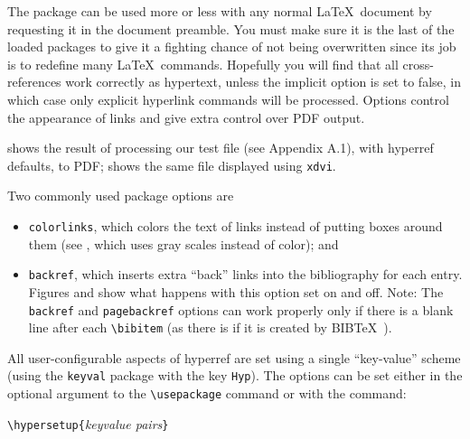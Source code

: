 
The package can be used more or less with any normal \LaTeX\  document
by requesting it in the document preamble. You must make sure it is the
last of the loaded packages to give it a fighting chance of not being
overwritten since its job is to redefine many \LaTeX\  commands.
Hopefully you will find that all cross-references work correctly as
hypertext, unless the implicit option is set to false, in which case
only explicit hyperlink commands will be processed. Options control the
appearance of links and give extra control over PDF output. 

 shows the result of processing our test file (see Appendix A.1), with 
hyperref defaults, to PDF;  shows the same file displayed using \verb|xdvi|. 
 
 
Two commonly used package options are 

\begin{itemize}
  \item \verb|colorlinks|, which colors the text of links instead of putting boxes around 
    them (see , which uses gray scales instead of color); and 
  \item \verb|backref|, which inserts extra ``back'' links into the bibliography for each entry. 
    Figures  and  show what happens with this
    option set on and off. Note: The \verb|backref| and
    \verb|pagebackref| options can work properly only if there is a
    blank line after each \verb|\bibitem| (as there is if it is created
    by BIB\TeX\ ). 
\end{itemize}




All user-configurable aspects of hyperref are set using a single
``key-value'' scheme 
(using the \verb|keyval| package with the key \verb|Hyp|). The options can be set either in the 
optional argument to the \verb|\usepackage| command or with the command: 

\begin{fminipage}{5in}
\verb|\hypersetup{|\emph{keyvalue pairs}\verb|}| 
\end{fminipage}

